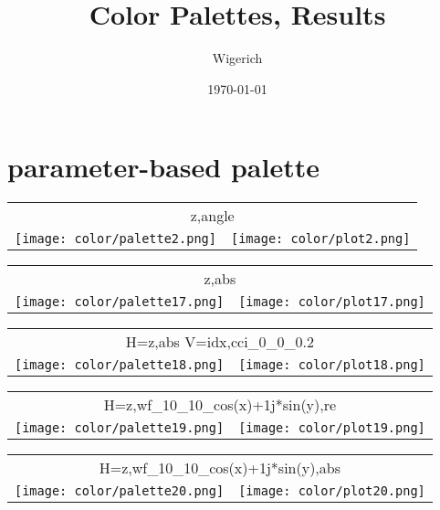 \documentclass{article}
\title{
\vskip 8cm
\Huge{Color}
\vskip 1cm
Palettes, Results
\vskip 2cm
}
\author{Wigerich}
\date{\today}
\begin{document}
\maketitle

\newpage
\section{parameter-based palette}
\begin{center}
\begin{tabular}{m{8cm}m{8cm}}
\multicolumn{2}{c}{z,angle} \\
\texttt{[image: color/palette2.png]} &
\texttt{[image: color/plot2.png]}
\end{tabular}
\end{center}

\begin{center}
\begin{tabular}{m{8cm}m{8cm}}
\multicolumn{2}{c}{z,abs} \\
\texttt{[image: color/palette17.png]} &
\texttt{[image: color/plot17.png]}
\end{tabular}
\end{center}

\begin{center}
\begin{tabular}{m{8cm}m{8cm}}
\multicolumn{2}{c}{H=z,abs V=idx,cci\_0\_0\_0.2} \\
\texttt{[image: color/palette18.png]} &
\texttt{[image: color/plot18.png]}
\end{tabular}
\end{center}

\begin{center}
\begin{tabular}{m{8cm}m{8cm}}
\multicolumn{2}{c}{H=z,wf\_10\_10\_cos(x)+1j*sin(y),re} \\
\texttt{[image: color/palette19.png]} &
\texttt{[image: color/plot19.png]}
\end{tabular}
\end{center}

\begin{center}
\begin{tabular}{m{8cm}m{8cm}}
\multicolumn{2}{c}{H=z,wf\_10\_10\_cos(x)+1j*sin(y),abs} \\
\texttt{[image: color/palette20.png]} &
\texttt{[image: color/plot20.png]}
\end{tabular}
\end{center}
\end{document}
